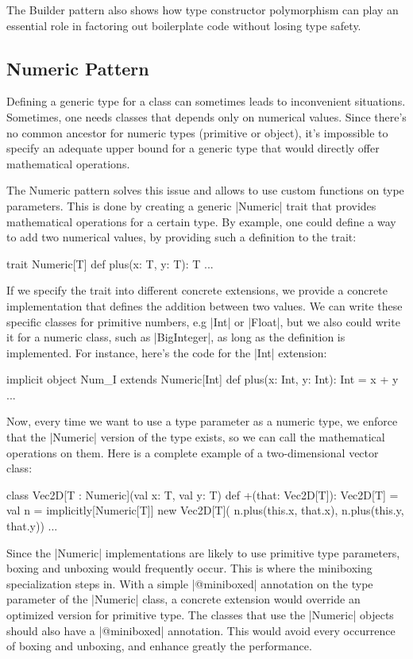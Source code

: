 The Builder pattern also shows how type constructor polymorphism can play an essential role in factoring out boilerplate code without losing type safety.\cite{adriaan}

\subsection{Numeric Pattern}

Defining a generic type for a class can sometimes leads to inconvenient situations. Sometimes, one needs classes that depends only on numerical values. Since there's no common ancestor for numeric types (primitive or object), it's impossible to specify an adequate upper bound for a generic type that would directly offer mathematical operations.

The Numeric pattern solves this issue and allows to use custom functions on type parameters. This is done by creating a generic |Numeric| trait that provides mathematical operations for a certain type. By example, one could define a way to add two numerical values, by providing such a definition to the trait:

\begin{lstlisting-nobreak}
 trait Numeric[T] {
   def plus(x: T, y: T): T
   ...
 }
\end{lstlisting-nobreak}

If we specify the trait into different concrete extensions, we provide a concrete implementation that defines the addition between two values. We can write these specific classes for primitive numbers, e.g |Int| or |Float|, but we also could write it for a numeric class, such as |BigInteger|, as long as the definition is implemented. For instance, here's the code for the |Int| extension:

\begin{lstlisting-nobreak}
 implicit object Num_I extends Numeric[Int] {
   def plus(x: Int, y: Int): Int = x + y
   ...
 }
\end{lstlisting-nobreak}

Now, every time we want to use a type parameter as a numeric type, we enforce that the |Numeric| version of the type exists, so we can call the mathematical operations on them. Here is a complete example of a two-dimensional vector class:

\begin{lstlisting-nobreak}
 class Vec2D[T : Numeric](val x: T, val y: T) {
   def +(that: Vec2D[T]): Vec2D[T] = {
     val n = implicitly[Numeric[T]]
     new Vec2D[T](
       n.plus(this.x, that.x),
       n.plus(this.y, that.y))
   }
   ...
 }
\end{lstlisting-nobreak}

Since the |Numeric| implementations are likely to use primitive type parameters, boxing and unboxing would frequently occur. This is where the miniboxing specialization steps in. With a simple |@miniboxed| annotation on the type parameter of the |Numeric| class, a concrete extension would override an optimized version for primitive type. The classes that use the |Numeric| objects should also have a |@miniboxed| annotation. This would avoid every occurrence of boxing and unboxing, and enhance greatly the performance.